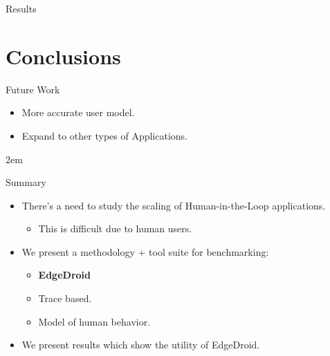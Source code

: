 \documentclass[aspectratio=1610]{beamer}
\begin{document}
\begin{frame}{Results}
\begin{center}
{        }%
    \end{center}
\end{frame}

\section{Conclusions}
\begin{frame}{Future Work}
    \begin{itemize}
        \itemsep2em
        \item More accurate user model.
        \item Expand to other types of Applications.
    \end{itemize}
\end{frame}\itemsep2em

\begin{frame}{Summary}
    \begin{itemize}
        \itemsep2em
        \item There's a need to study the scaling of Human-in-the-Loop applications.
        \begin{itemize}
            \item This is difficult due to human users.
        \end{itemize}
        \item We present a methodology + tool suite for benchmarking:
        \begin{itemize}
            \item \textbf{EdgeDroid}
            \item Trace based.
            \item Model of human behavior.
        \end{itemize}
        \item We present results which show the utility of EdgeDroid.
    \end{itemize}
\end{frame}
\end{document}
